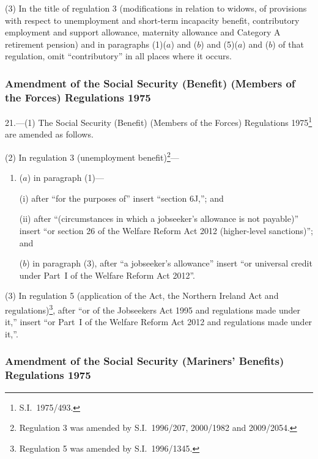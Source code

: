 \documentclass[12pt,a4paper]{article}
\begin{document}
(3) In the title of regulation 3 (modifications in relation to widows, of provisions with respect to unemployment and short-term incapacity benefit, contributory employment and support allowance, maternity allowance and Category A retirement pension) and in paragraphs (1)($a$)  and ($b$)  and (5)($a$)  and ($b$)  of that regulation, omit “contributory” in all places where it occurs.

\subsubsection[21. Amendment of the Social Security (Benefit) (Members of the Forces) Regulations 1975]{\sloppy Amendment of the Social Security (Benefit) (Members of the Forces) Regulations 1975}

21.—(1) The Social Security (Benefit) (Members of the Forces) Regulations 1975\footnote{S.I.~1975/493.} are amended as follows.

(2) In regulation 3 (unemployment benefit)\footnote{Regulation 3 was amended by S.I.~1996/207, 2000/1982 and 2009/2054.}—
\begin{enumerate}\item[]
($a$) in paragraph (1)—

(i) after “for the purposes of” insert “section 6J,”; and

\begin{sloppypar}
(ii) after “(circumstances in which a jobseeker’s allowance is not payable)” insert “or section 26 of the Welfare Reform Act 2012 (higher-level sanctions)”; and
\end{sloppypar}

($b$) in paragraph (3), after “a jobseeker’s allowance” insert “or universal credit under Part~I of the Welfare Reform Act 2012”.
\end{enumerate}

(3) In regulation 5 (application of the Act, the Northern Ireland Act and regulations)\footnote{Regulation 5 was amended by S.I.~1996/1345.}, after “or of the Jobseekers Act 1995 and regulations made under it,” insert “or Part~I of the Welfare Reform Act 2012 and regulations made under it,”.

\subsubsection[22. Amendment of the Social Security (Mariners’ Benefits) Regulations 1975]{Amendment of the Social Security (Mariners’ Benefits) Regulations 1975}
\end{document}
